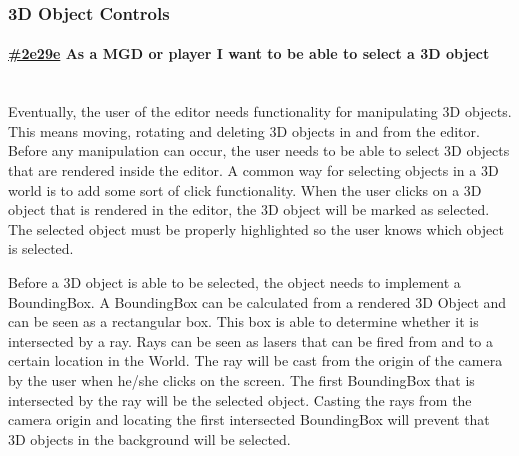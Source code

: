 \documentclass[10pt]{extarticle} %
\newcommand{\myparagraph}[1]{\paragraph{#1}\mbox{}\\} %
\begin{document}
    \subsubsection{3D Object Controls}
    \myparagraph{\href{\clickup{2e29e}}{\#2e29e} As a MGD or player I want to be able to select a 3D object}
    Eventually, the user of the editor needs functionality for manipulating 3D objects.
    This means moving, rotating and deleting 3D objects in and from the editor.
    Before any manipulation can occur, the user needs to be able to select 3D objects that are rendered inside the editor.
    A common way for selecting objects in a 3D world is to add some sort of click functionality.
    When the user clicks on a 3D object that is rendered in the editor, the 3D object will be marked as selected.
    The selected object must be properly highlighted so the user knows which object is selected.

    Before a 3D object is able to be selected, the object needs to implement a BoundingBox.
    A BoundingBox can be calculated from a rendered 3D Object and can be seen as a rectangular box.
    This box is able to determine whether it is intersected by a ray.
    Rays can be seen as lasers that can be fired from and to a certain location in the World.
    The ray will be cast from the origin of the camera by the user when he/she clicks on the screen.
    The first BoundingBox that is intersected by the ray will be the selected object.
    Casting the rays from the camera origin and locating the first intersected BoundingBox will prevent that 3D objects in the background will be selected.
\end{document}
